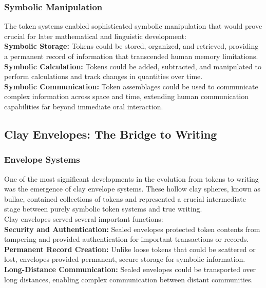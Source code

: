 \documentclass[12pt, oneside, openany]{book}
\begin{document}
\subsubsection{Symbolic Manipulation}

The token systems enabled sophisticated symbolic manipulation that would prove crucial for later mathematical and linguistic development:\\
\textbf{Symbolic Storage:} Tokens could be stored, organized, and retrieved, providing a permanent record of information that transcended human memory limitations.\\
\textbf{Symbolic Calculation:} Tokens could be added, subtracted, and manipulated to perform calculations and track changes in quantities over time.\\
\textbf{Symbolic Communication:} Token assemblages could be used to communicate complex information across space and time, extending human communication capabilities far beyond immediate oral interaction.

\subsection{Clay Envelopes: The Bridge to Writing}

\subsubsection{Envelope Systems}

One of the most significant developments in the evolution from tokens to writing was the emergence of clay envelope systems. These hollow clay spheres, known as bullae, contained collections of tokens and represented a crucial intermediate stage between purely symbolic token systems and true writing.\\
Clay envelopes served several important functions:\\
\textbf{Security and Authentication:} Sealed envelopes protected token contents from tampering and provided authentication for important transactions or records.\\
\textbf{Permanent Record Creation:} Unlike loose tokens that could be scattered or lost, envelopes provided permanent, secure storage for symbolic information.\\
\textbf{Long-Distance Communication:} Sealed envelopes could be transported over long distances, enabling complex communication between distant communities.\\
\end{document}
